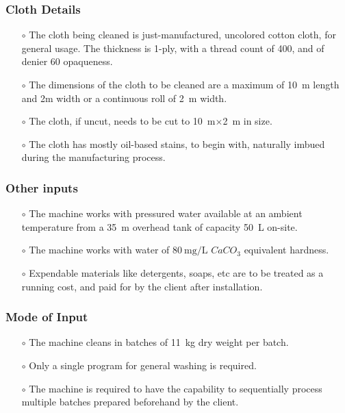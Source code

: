 \documentclass[12pt]{article}
\begin{document}
\subsubsection{Cloth Details}
\begin{itemize}
    \item[$\scriptstyle\circ$] The cloth being cleaned is just-manufactured, uncolored cotton cloth, for general usage. The thickness is 1-ply, with a \gls{thread count} of 400, and of \gls{denier} 60 \gls{opaqueness}.
    \item[$\scriptstyle\circ$] The dimensions of the cloth to be cleaned are a maximum of \SI{10}{\meter} length and 2m width or a continuous roll of \SI{2}{\meter} width.
    \item[$\scriptstyle\circ$] The cloth, if uncut, needs to be cut to \SI{10}{\meter}$\times$\SI{2}{\meter} in size.
    \item[$\scriptstyle\circ$] The cloth has mostly oil-based stains, to begin with, naturally imbued during the manufacturing process.
\end{itemize}
\subsubsection{Other inputs}
\begin{itemize}
    \item[$\scriptstyle\circ$] The machine works with pressured water available at an ambient temperature from a \SI{35}{\meter} overhead tank of capacity \SI{50}{\liter} on-site. 
    \item[$\scriptstyle\circ$] The machine works with water of $\SI{80}{\milli\gram\per\liter}$ $CaCO_3$ equivalent \gls{hardness}.
    \item[$\scriptstyle\circ$] \gls{Expendable materials} like detergents, soaps, etc are to be treated as a running cost, and paid for by the client after installation.
\end{itemize}
\subsubsection{Mode of Input}
\begin{itemize}
    \item[$\scriptstyle\circ$] The machine cleans in batches of \SI{11}{\kilogram} dry weight per batch.
    \item[$\scriptstyle\circ$] Only a single program for general washing is required.
    \item[$\scriptstyle\circ$]The machine is required to have the capability to sequentially process multiple batches prepared beforehand by the client. 
\end{itemize}
\end{document}
